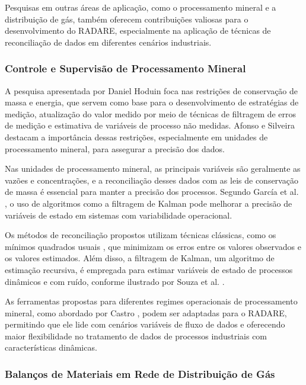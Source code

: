 Pesquisas em outras áreas de aplicação, como o processamento mineral e a distribuição de gás, também oferecem contribuições valiosas para o desenvolvimento do RADARE, especialmente na aplicação de técnicas de reconciliação de dados em diferentes cenários industriais.

\subsubsection{Controle e Supervisão de Processamento Mineral}

A pesquisa apresentada por Daniel Hoduin \cite{danielhoduin} foca nas restrições de conservação de massa e energia, que servem como base para o desenvolvimento de estratégias de medição, atualização do valor medido por meio de técnicas de filtragem de erros de medição e estimativa de variáveis de processo não medidas. Afonso e Silveira \cite{afonsosilveira2015} destacam a importância dessas restrições, especialmente em unidades de processamento mineral, para assegurar a precisão dos dados.

Nas unidades de processamento mineral, as principais variáveis são geralmente as vazões e concentrações, e a reconciliação desses dados com as leis de conservação de massa é essencial para manter a precisão dos processos. Segundo García et al. \cite{garcia2018}, o uso de algoritmos como a filtragem de Kalman pode melhorar a precisão de variáveis de estado em sistemas com variabilidade operacional.

Os métodos de reconciliação propostos utilizam técnicas clássicas, como os mínimos quadrados usuais \cite{limapereira2019}, que minimizam os erros entre os valores observados e os valores estimados. Além disso, a filtragem de Kalman, um algoritmo de estimação recursiva, é empregada para estimar variáveis de estado de processos dinâmicos e com ruído, conforme ilustrado por Souza et al. \cite{souza2021}.

As ferramentas propostas para diferentes regimes operacionais de processamento mineral, como abordado por Castro \cite{castro2020}, podem ser adaptadas para o RADARE, permitindo que ele lide com cenários variáveis de fluxo de dados e oferecendo maior flexibilidade no tratamento de dados de processos industriais com características dinâmicas.

\subsubsection{Balanços de Materiais em Rede de Distribuição de Gás}

